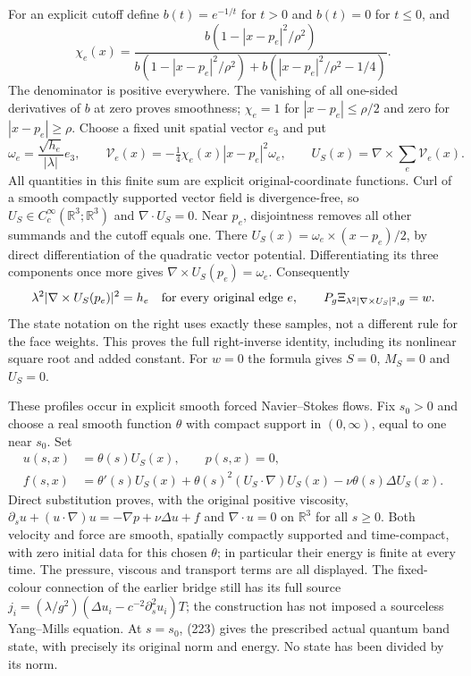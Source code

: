 \documentclass[11pt]{article}
\begin{document}
For an explicit cutoff define $b(t)=e^{-1/t}$ for $t>0$ and
$b(t)=0$ for $t\le0$, and
\[
 \chi_e(x)=\frac{b(1-|x-p_e|^2/\rho^2)}
 {b(1-|x-p_e|^2/\rho^2)+b(|x-p_e|^2/\rho^2-1/4)}.
\]
The denominator is positive everywhere. The vanishing of all
one-sided derivatives of $b$ at zero proves smoothness;
$\chi_e=1$ for $|x-p_e|\le\rho/2$ and zero for
$|x-p_e|\ge\rho$. Choose a fixed unit spatial vector $e_3$ and put
\begin{equation}\label{eq:band-fluid-right-inverse}
 \omega_e=\frac{\sqrt{h_e}}{|\lambda|}e_3,\qquad
 \mathcal V_e(x)=-\tfrac14\chi_e(x)|x-p_e|^2\omega_e,
 \qquad U_S(x)=\nabla\times\sum_e\mathcal V_e(x).
\end{equation}
All quantities in this finite sum are explicit original-coordinate
functions. Curl of a smooth compactly supported vector field is
divergence-free, so $U_S\in C_c^\infty(\mathbb R^3;\mathbb R^3)$
and $\nabla\cdot U_S=0$. Near $p_e$, disjointness removes all other
summands and the cutoff equals one. There
$U_S(x)=\omega_e\times(x-p_e)/2$, by direct differentiation of
the quadratic vector potential. Differentiating its three components
once more gives $\nabla\times U_S(p_e)=\omega_e$. Consequently
\begin{equation}\label{eq:band-fluid-sampling}
 \lambda^2|\nabla\times U_S(p_e)|^2=h_e\quad\hbox{for every original edge }e,
 \qquad P_g\Xi_{\lambda^2|\nabla\times U_S|^2,g}=w.
\end{equation}
The state notation on the right uses exactly these samples, not a
different rule for the face weights. This proves the full right-inverse
identity, including its nonlinear square root and added constant.
For $w=0$ the formula gives $S=0$, $M_S=0$ and $U_S=0$.

These profiles occur in explicit smooth forced Navier--Stokes flows.
Fix $s_0>0$ and choose a real smooth function $\theta$ with compact
support in $(0,\infty)$, equal to one near $s_0$. Set
\begin{align}
 u(s,x)&=\theta(s)U_S(x),\qquad p(s,x)=0,\nonumber\\
 f(s,x)&=\theta'(s)U_S(x)
    +\theta(s)^2(U_S\cdot\nabla)U_S(x)-\nu\theta(s)\Delta U_S(x).
 \label{eq:band-forced-fluid}
\end{align}
Direct substitution proves, with the original positive viscosity,
$\partial_su+(u\cdot\nabla)u=-\nabla p+\nu\Delta u+f$ and
$\nabla\cdot u=0$ on $\mathbb R^3$ for all $s\ge0$.
Both velocity and force are smooth, spatially compactly supported
and time-compact, with zero initial data for this chosen $\theta$;
in particular their energy is finite at every time. The pressure,
viscous and transport terms are all displayed. The fixed-colour
connection of the earlier bridge still has its full source
$j_i=(\lambda/g^2)(\Delta u_i-c^{-2}\partial_s^2u_i)T$;
the construction has not imposed a sourceless Yang--Mills equation.
At $s=s_0$, (223) gives the prescribed
actual quantum band state, with precisely its original norm and
energy. No state has been divided by its norm.
\end{document}
